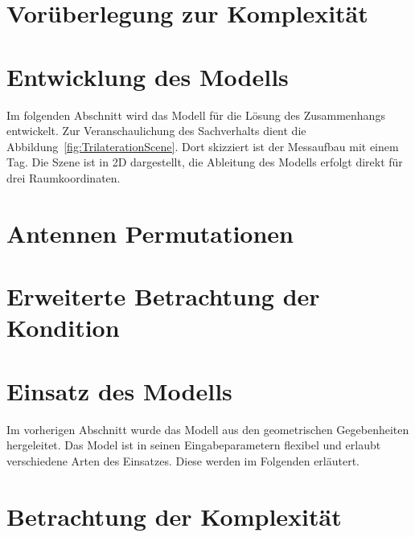 \section{Vorüberlegung zur Komplexität}
\label{sec:Komplexity1}

%
\section{Entwicklung des Modells}
\label{sec:model_developement}
Im folgenden Abschnitt wird das Modell für die Lösung des Zusammenhangs entwickelt. Zur Veranschaulichung des Sachverhalts dient die Abbildung~\ref{fig:TrilaterationScene}. Dort skizziert ist der Messaufbau mit einem Tag. Die Szene ist in 2D dargestellt, die Ableitung des Modells erfolgt direkt für drei Raumkoordinaten.
%

%
\section{Antennen Permutationen}

%
\section{Erweiterte Betrachtung der Kondition}
%
\label{sec:ExtendedContidion}

%
\section{Einsatz des Modells}
\label{sec:use_of_model}
Im vorherigen Abschnitt wurde das Modell aus den geometrischen Gegebenheiten hergeleitet. Das Model ist in seinen Eingabeparametern flexibel und erlaubt verschiedene Arten des Einsatzes. Diese werden im Folgenden erläutert.
%

%
\section{Betrachtung der Komplexität}
\label{sec:Komplexity2}

%
